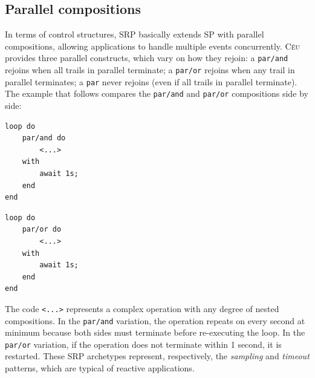 \documentclass{acm_proc_article-sp}
\newcommand{\CEU}{\textsc{C\'{e}u}\xspace}
\newcommand{\code}[1] {{\small{\texttt{#1}}}}
\newcommand{\1}{\;}
\newcommand{\2}{\;\;}
\newcommand{\3}{\;\;\;}
\newcommand{\5}{\;\;\;\;\;}
\begin{document}


\subsection{Parallel compositions}
\label{sec.ceu.par}

In terms of control structures, SRP basically extends SP with parallel 
compositions, allowing applications to handle multiple events concurrently.
%
\CEU provides three parallel constructs, which vary on how they rejoin:
a \code{par/and} rejoins when all trails in parallel terminate;
a \code{par/or} rejoins when any trail in parallel terminates;
a \code{par} never rejoins (even if all trails in parallel terminate).
%
The example that follows compares the \code{par/and} and \code{par/or} 
compositions side by side:

\begin{minipage}[t]{0.40\linewidth}
\begin{lstlisting}
loop do
    par/and do
        <...>
    with
        await 1s;
    end
end
\end{lstlisting}
\end{minipage}
%
\begin{minipage}[t]{0.40\linewidth}
\begin{lstlisting}
loop do
    par/or do
        <...>
    with
        await 1s;
    end
end
\end{lstlisting}
\end{minipage}

The code \code{<...>} represents a complex operation with any degree of nested 
compositions.
%
In the \code{par/and} variation, the operation repeats on every second at 
minimum because both sides must terminate before re-executing the loop.
In the \code{par/or} variation, if the operation does not terminate within 1 
second, it is restarted.
%
These SRP archetypes represent, respectively, the \emph{sampling} and 
\emph{timeout} patterns, which are typical of reactive applications.
\end{document}
